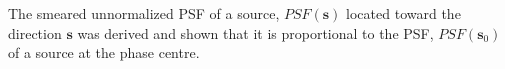 The smeared unnormalized PSF of a source, $PSF(\mathbf{s})$ located toward the
direction $\mathbf{s}$ was derived and shown that it is proportional
to the PSF, $PSF(\mathbf{s}_0)$ of a source at the phase centre.
% 
